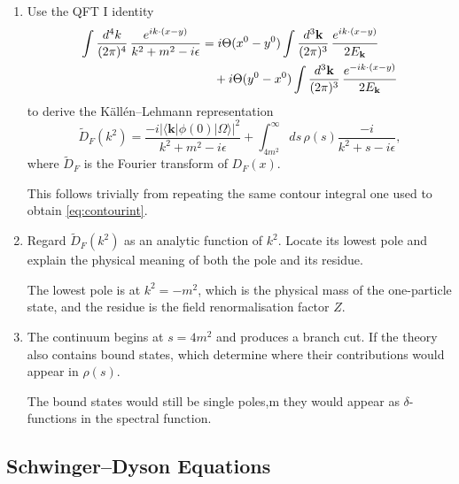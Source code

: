 \begin{enumerate}[label=\alph*)]
    \item Use the QFT I identity
    \begin{align}
        \int\frac{d^4k}{(2\pi)^4}\,
        \frac{e^{ik\cdot(x-y)}}{k^2+m^2-i\epsilon}
        &={}
        i\Theta(x^0-y^0)
        \int\frac{d^3\mathbf k}{(2\pi)^3}\,
        \frac{e^{ik\cdot(x-y)}}{2E_{\mathbf k}}
        \notag\\
        &\quad+
        i\Theta(y^0-x^0)
        \int\frac{d^3\mathbf k}{(2\pi)^3}\,
        \frac{e^{-ik\cdot(x-y)}}{2E_{\mathbf k}}
        \label{eq:contourint}
    \end{align}
    to derive the K\"all\'en--Lehmann representation
    \begin{equation}
        \widetilde D_F(k^2)
        =\frac{-i\left|\langle\mathbf k|\phi(0)|\Omega\rangle\right|^2}
               {k^2+m^2-i\epsilon}
        +\int_{4m^2}^{\infty}ds\,\rho(s)
        \frac{-i}{k^2+s-i\epsilon},
    \end{equation}
    where $\widetilde D_F$ is the Fourier transform of $D_F(x)$.
    \begin{solution}
        This follows trivially from repeating the same contour integral one used to obtain \eqref{eq:contourint}.
    \end{solution}

    \item Regard $\widetilde D_F(k^2)$ as an analytic function of $k^2$. Locate
    its lowest pole and explain the physical meaning of both the pole and its residue.
    \begin{solution}
        The lowest pole is at $k^2 = -m^2$, which is the physical mass of the one-particle state, and the residue is the field renormalisation factor $Z$.
    \end{solution}

    \item The continuum begins at $s=4m^2$ and produces a branch cut. If the
    theory also contains bound states, which determine where their contributions would
    appear in $\rho(s)$.
    \begin{solution}
        The bound states would still be single poles,m they would appear as $\delta$-functions in the spectral function.
    \end{solution}
\end{enumerate}

\subsection{Schwinger--Dyson Equations}

